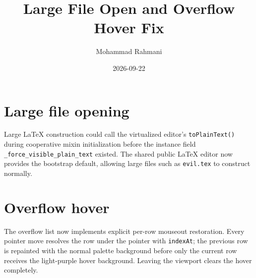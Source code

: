 \documentclass[a4paper]{article}
\title{Large File Open and Overflow Hover Fix}
\date{2026-09-22}
\author{Mohammad Rahmani}
\begin{document}
   \maketitle

   \begin{preview}
      \section{Large file opening}
      Large LaTeX construction could call the virtualized editor's
      \texttt{toPlainText()} during cooperative mixin initialization before the
      instance field \texttt{\_force\_visible\_plain\_text} existed.  The
      shared public LaTeX editor now provides the bootstrap default, allowing
      large files such as \texttt{evil.tex} to construct normally.

      \section{Overflow hover}
      The overflow list now implements explicit per-row mouseout restoration.
      Every pointer move resolves the row under the pointer with
      \texttt{indexAt}; the previous row is repainted with the normal palette
      background before only the current row receives the light-purple hover
      background. Leaving the viewport clears the hover completely.
   \end{preview}

   
   
\end{document}
